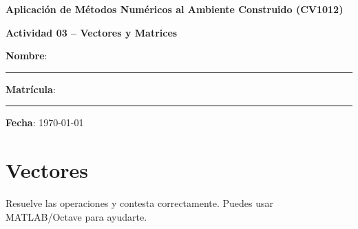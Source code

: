 \documentclass[spanish, 10pt]{article}
\begin{document}
\begin{center}
	{\Large \textbf{Aplicación de Métodos Numéricos al Ambiente Construido (CV1012)}}
	
	\bigskip
	{\large \textbf{Actividad 03 -- Vectores y Matrices}}
\end{center}

\bigskip
{\large \textbf{Nombre}: \rule{13.7 cm}{0.4mm}}



\bigskip
{\large \textbf{Matrícula}: \rule{5 cm}{0.4mm}} \hfill {\large \textbf{Fecha}: \today}

\bigskip


\section{Vectores}

Resuelve las operaciones y contesta correctamente. Puedes usar MATLAB/Octave para ayudarte.

\vspace{3ex}
\end{document}
